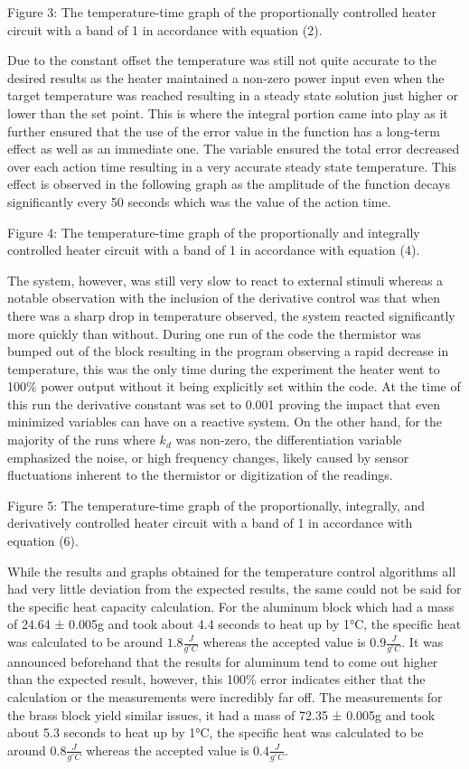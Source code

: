 \documentclass[11pt]{article}
\begin{document}
    Figure 3: The temperature-time graph of the proportionally controlled
heater circuit with a band of 1 in accordance with equation (2).

    Due to the constant offset the temperature was still not quite accurate
to the desired results as the heater maintained a non-zero power input
even when the target temperature was reached resulting in a steady state
solution just higher or lower than the set point. This is where the
integral portion came into play as it further ensured that the use of
the error value in the function has a long-term effect as well as an
immediate one. The variable ensured the total error decreased over each
action time resulting in a very accurate steady state temperature. This
effect is observed in the following graph as the amplitude of the
function decays significantly every 50 seconds which was the value of
the action time.

    Figure 4: The temperature-time graph of the proportionally and
integrally controlled heater circuit with a band of 1 in accordance with
equation (4).

    The system, however, was still very slow to react to external stimuli
whereas a notable observation with the inclusion of the derivative
control was that when there was a sharp drop in temperature observed,
the system reacted significantly more quickly than without. During one
run of the code the thermistor was bumped out of the block resulting in
the program observing a rapid decrease in temperature, this was the only
time during the experiment the heater went to 100\% power output without
it being explicitly set within the code. At the time of this run the
derivative constant was set to 0.001 proving the impact that even
minimized variables can have on a reactive system. On the other hand,
for the majority of the runs where \(k_d\) was non-zero, the
differentiation variable emphasized the noise, or high frequency
changes, likely caused by sensor fluctuations inherent to the thermistor
or digitization of the readings.

    Figure 5: The temperature-time graph of the proportionally, integrally,
and derivatively controlled heater circuit with a band of 1 in
accordance with equation (6).

    While the results and graphs obtained for the temperature control
algorithms all had very little deviation from the expected results, the
same could not be said for the specific heat capacity calculation. For
the aluminum block which had a mass of 24.64 ± 0.005g and took about 4.4
seconds to heat up by 1°C, the specific heat was calculated to be around
\(1.8 \frac{J}{g^{\circ}C}\) whereas the accepted value is
\(0.9 \frac{J}{g^{\circ}C}\). It was announced beforehand that the
results for aluminum tend to come out higher than the expected result,
however, this 100\% error indicates either that the calculation or the
measurements were incredibly far off. The measurements for the brass
block yield similar issues, it had a mass of 72.35 ± 0.005g and took
about 5.3 seconds to heat up by 1°C, the specific heat was calculated to
be around \(0.8 \frac{J}{g^{\circ}C}\) whereas the accepted value is
\(0.4 \frac{J}{g^{\circ}C}\).
\end{document}
